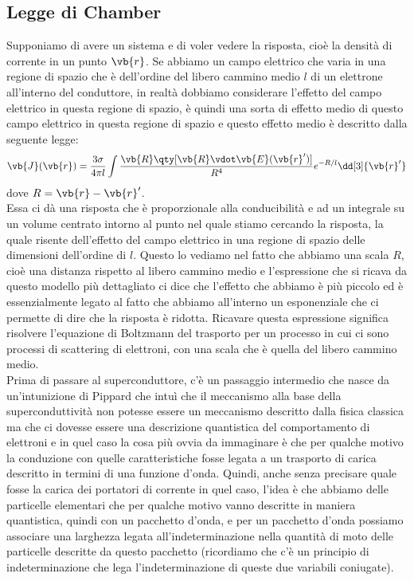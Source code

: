 \subsection{Legge di Chamber}
Supponiamo di avere un sistema e di voler vedere la risposta, cioè la densità di corrente in un punto $\vb{r}$. Se abbiamo un campo elettrico che varia in una regione di spazio che è dell'ordine del libero cammino medio $l$ di un elettrone all'interno del conduttore, in realtà dobbiamo considerare l'effetto del campo elettrico in questa regione di spazio, è quindi una sorta di effetto medio di questo campo elettrico in questa regione di spazio e questo effetto medio è descritto dalla seguente legge:
\begin{equation}
   \vb{J}(\vb{r})
   =\frac{3\sigma}{4\pi l} \int \frac{\vb{R} \qty[ \vb{R} \vdot \vb{E}(\vb{r}') ] }{R^4} e^{-R/l} \dd[3]{\vb{r}'}
   \label{eq:legge_di_Chamber}
\end{equation}
dove $R=\vb{r} - \vb{r}'$.\\
Essa ci dà una risposta che è proporzionale alla conducibilità e ad un integrale su un volume centrato intorno al punto nel quale stiamo cercando la risposta, la quale risente dell'effetto del campo elettrico  in una regione di spazio delle dimensioni dell'ordine di $l$. Questo lo vediamo nel fatto che abbiamo una scala $R$, cioè una distanza rispetto al libero cammino medio e l'espressione che si ricava da questo modello più dettagliato ci dice che l'effetto che abbiamo è più piccolo ed è essenzialmente legato al fatto che abbiamo all'interno un esponenziale che ci permette di dire che la risposta è ridotta. Ricavare questa espressione significa risolvere l'equazione di Boltzmann del trasporto per un processo in cui ci sono processi di scattering di elettroni, con una scala che è quella del libero cammino medio.\\
Prima di passare al superconduttore, c'è un passaggio intermedio che nasce da un'intunizione di Pippard che intuì che il meccanismo alla base della superconduttività non potesse essere un meccanismo descritto dalla fisica classica ma che ci dovesse essere una descrizione quantistica del comportamento di elettroni e in quel caso la cosa più ovvia da immaginare è che per qualche motivo la conduzione con quelle caratteristiche fosse legata a un trasporto di carica descritto in termini di una funzione d'onda. Quindi, anche senza precisare quale fosse la carica dei portatori di corrente in quel caso, l'idea è che abbiamo delle particelle elementari che per qualche motivo vanno descritte in maniera quantistica, quindi con un pacchetto d'onda, e per un pacchetto d'onda possiamo associare una larghezza legata all'indeterminazione nella quantità di moto delle particelle descritte da questo pacchetto (ricordiamo che c'è un principio di indeterminazione che lega l'indeterminazione di queste due variabili coniugate).\\
